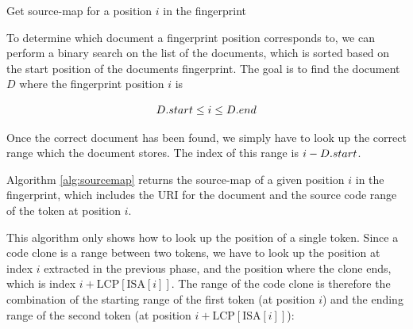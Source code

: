 \begin{algorithm}[t]
  \SetAlgoLined\DontPrintSemicolon

  \vspace{0.5cm}
  \caption{Get source-map for a position $i$ in the fingerprint}
  \label{alg:sourcemap}
\end{algorithm}

To determine which document a fingerprint position corresponds to, we can perform a binary
search on the list of the documents, which is sorted based on the start position of the
documents fingerprint. The goal is to find the document $D$ where the fingerprint position $i$
is 

$$
{{D}.{start}} \leq i \leq {{D}.{end}}
$$

Once the correct document has been found, we simply have to look up the correct range
which the document stores. The index of this range is $i -
{{D}.{start}}$.

Algorithm \ref{alg:sourcemap} returns the source-map of a given position $i$ in the
fingerprint, which includes the URI for the document and the source code range of the
token at position $i$.

This algorithm only shows how to look up the position of a single token. Since a code
clone is a range between two tokens, we have to look up the position at index $i$
extracted in the previous phase, and the position where the clone ends, which is index $i
+ \text{LCP}[\text{ISA}[i]]$. The range of the code clone is therefore the combination of
the starting range of the first token (at position $i$) and the ending range of the second
token (at position $i + \text{LCP}[\text{ISA}[i]]$):

